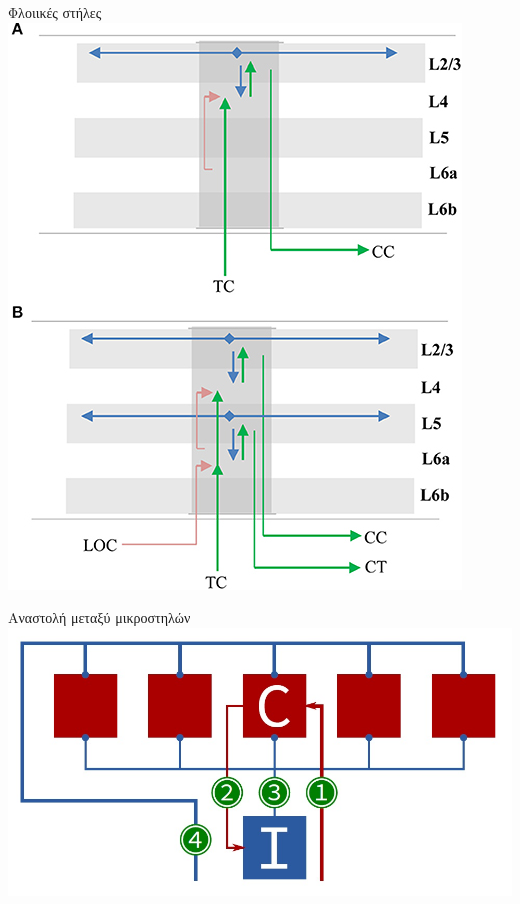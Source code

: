 \documentclass[10pt,lualatex]{beamer}
\begin{document}
\begin{frame}{Φλοιικές στήλες}
  \centering
  \includegraphics[width=.6\textwidth]{../figures/layers_in_column}
\end{frame}

\begin{frame}{Αναστολή μεταξύ μικροστηλών}
  \centering
  \includegraphics[width=.85\textwidth]{../figures/spatial_hardware}
\end{frame}
\end{document}
